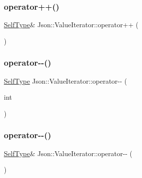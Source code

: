 \subsubsection{\texorpdfstring{operator++()}{operator++()}\hspace{0.1cm}{\footnotesize\ttfamily [2/2]}}
{\footnotesize\ttfamily \hyperlink{classJson_1_1ValueIteratorBase_a9d2a940d03ea06d20d972f41a89149ee_a9d2a940d03ea06d20d972f41a89149ee}{Self\+Type}\& Json\+::\+Value\+Iterator\+::operator++ (\begin{DoxyParamCaption}{ }\end{DoxyParamCaption})\hspace{0.3cm}{\ttfamily [inline]}}

\mbox{\label{classJson_1_1ValueIterator_a06d6a29d96caf6af324a53973159e12b_a06d6a29d96caf6af324a53973159e12b}} 
\subsubsection{\texorpdfstring{operator-\/-\/()}{operator--()}\hspace{0.1cm}{\footnotesize\ttfamily [1/2]}}
{\footnotesize\ttfamily \hyperlink{classJson_1_1ValueIteratorBase_a9d2a940d03ea06d20d972f41a89149ee_a9d2a940d03ea06d20d972f41a89149ee}{Self\+Type} Json\+::\+Value\+Iterator\+::operator-\/-\/ (\begin{DoxyParamCaption}\item[{int}]{ }\end{DoxyParamCaption})\hspace{0.3cm}{\ttfamily [inline]}}

\mbox{\label{classJson_1_1ValueIterator_a811302a868518a0995a9def955df5720_a811302a868518a0995a9def955df5720}} 
\subsubsection{\texorpdfstring{operator-\/-\/()}{operator--()}\hspace{0.1cm}{\footnotesize\ttfamily [2/2]}}
{\footnotesize\ttfamily \hyperlink{classJson_1_1ValueIteratorBase_a9d2a940d03ea06d20d972f41a89149ee_a9d2a940d03ea06d20d972f41a89149ee}{Self\+Type}\& Json\+::\+Value\+Iterator\+::operator-\/-\/ (\begin{DoxyParamCaption}{ }\end{DoxyParamCaption})\hspace{0.3cm}{\ttfamily [inline]}}

